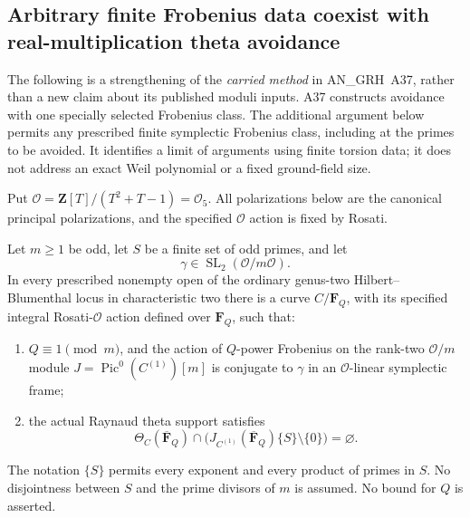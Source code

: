 \subsection{Arbitrary finite Frobenius data coexist with real-multiplication theta avoidance}
\label{sec:kt-rm-frobenius-avoidance}

The following is a strengthening of the \emph{carried method} in
AN\_GRH~A37, rather than a new claim about its published moduli
inputs.  A37 constructs avoidance with one specially selected
Frobenius class.  The additional argument below permits any
prescribed finite symplectic Frobenius class, including at the
primes to be avoided.  It identifies a limit of arguments using
finite torsion data; it does not address an exact Weil polynomial
or a fixed ground-field size.

Put $\mathcal O=\mathbf Z[T]/(T^2+T-1)=\mathcal O_5$.
All polarizations below are the canonical principal polarizations,
and the specified $\mathcal O$ action is fixed by Rosati.

\begin{theorem}
Let $m\geq1$ be odd, let $S$ be a finite set of odd primes, and
let
\[
                    \gamma\in\operatorname{SL}_2(\mathcal O/m\mathcal O).
                                                               \tag{RF.1}
\]
In every prescribed nonempty open of the ordinary genus-two
Hilbert--Blumenthal locus in characteristic two there is a curve
$C/\mathbf F_Q$,
with its specified integral Rosati-$\mathcal O$ action defined
over $\mathbf F_Q$, such that:
\begin{enumerate}
\item $Q\equiv1\pmod m$, and the action of $Q$-power Frobenius
      on the rank-two $\mathcal O/m$ module
      $J=\operatorname{Pic}^0(C^{(1)})[m]$ is conjugate to $\gamma$
      in an $\mathcal O$-linear symplectic frame;
\item the actual Raynaud theta support satisfies
\[
 \Theta_C(\overline{\mathbf F}_Q)\cap
 \bigl(J_{C^{(1)}}(\overline{\mathbf F}_Q)\{S\}\setminus\{0\}\bigr)
                          =\varnothing.                       \tag{RF.2}
\]
\end{enumerate}
The notation $\{S\}$ permits every exponent and every product
of primes in $S$.  No disjointness between $S$ and the prime
divisors of $m$ is assumed.  No bound for $Q$ is asserted.
\end{theorem}

